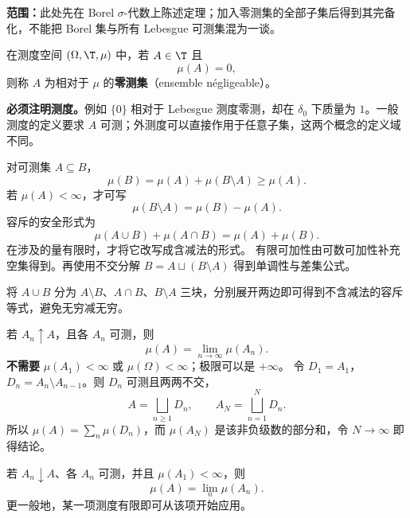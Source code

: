 \textbf{范围：}此处先在 Borel $\sigma$-代数上陈述定理；加入零测集的全部子集后得到其完备化，不能把 Borel 集与所有 Lebesgue 可测集混为一谈。

在测度空间 $(\Omega,\T,\mu)$ 中，若 $A\in\T$ 且
\[
\mu(A)=0,
\]
则称 $A$ 为相对于 $\mu$ 的\textbf{零测集}（ensemble négligeable）。

\textbf{必须注明测度。}例如 $\{0\}$ 相对于 Lebesgue 测度零测，却在 $\delta_0$ 下质量为 $1$。一般测度的定义要求 $A$ 可测；外测度可以直接作用于任意子集，这两个概念的定义域不同。

对可测集 $A\subseteq B$，
\[
\mu(B)=\mu(A)+\mu(B\setminus A)\ge\mu(A).
\]
若 $\mu(A)<\infty$，才可写
\[
\mu(B\setminus A)=\mu(B)-\mu(A).
\]
容斥的安全形式为
\[
\mu(A\cup B)+\mu(A\cap B)=\mu(A)+\mu(B).
\]
在涉及的量有限时，才将它改写成含减法的形式。
有限可加性由可数可加性补充空集得到。再使用不交分解 $B=A\sqcup(B\setminus A)$ 得到单调性与差集公式。

将 $A\cup B$ 分为 $A\setminus B$、$A\cap B$、$B\setminus A$ 三块，分别展开两边即可得到不含减法的容斥等式，避免无穷减无穷。

若 $A_n\uparrow A$，且各 $A_n$ 可测，则
\[
\mu(A)=\lim_{n\to\infty}\mu(A_n).
\]
\textbf{不需要} $\mu(A_1)<\infty$ 或 $\mu(\Omega)<\infty$；极限可以是 $+\infty$。
令 $D_1=A_1$，$D_n=A_n\setminus A_{n-1}$。则 $D_n$ 可测且两两不交，
\[
A=\bigsqcup_{n\ge1}D_n,\qquad
A_N=\bigsqcup_{n=1}^{N}D_n.
\]
所以 $\mu(A)=\sum_n\mu(D_n)$，而 $\mu(A_N)$ 是该非负级数的部分和，令 $N\to\infty$ 即得结论。

若 $A_n\downarrow A$、各 $A_n$ 可测，并且 $\mu(A_1)<\infty$，则
\[
\mu(A)=\lim_n\mu(A_n).
\]
更一般地，某一项测度有限即可从该项开始应用。

